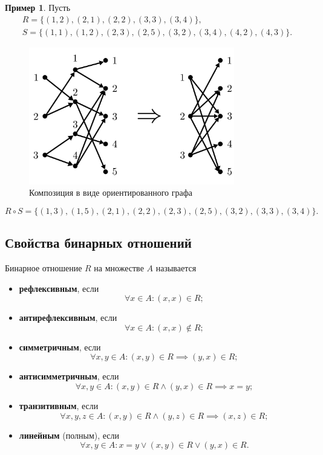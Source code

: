 \documentclass[a5paper, 11pt]{extarticle}
\theoremstyle{definition}
\newtheorem*{example*}{Пример}
\theoremstyle{definition}
\theoremstyle{definition}
\numberwithin{figure}{section}
\numberwithin{table}{section}
\begin{document}
\begin{example*}
    Пусть
    \begin{gather*}
        R = \{(1, 2), (2, 1), (2, 2), (3, 3), (3, 4)\}, \\
        S = \{(1, 1), (1, 2), (2, 3), (2, 5), (3, 2), (3, 4), (4, 2), (4, 3)\}.
    \end{gather*}

    \begin{figure}[H]
        \centering
        \includegraphics[width=0.8\textwidth]{images/composition-graph.png}
        \caption{Композиция в виде ориентированного графа}
    \end{figure}

    \[
        R \circ S = \{(1, 3), (1, 5), (2, 1), (2, 2), (2, 3), (2, 5), (3, 2), (3, 3), (3, 4)\}.
    \]
\end{example*}

\subsection{Свойства бинарных отношений}

Бинарное отношение \(R\) на множестве \(A\) называется
\begin{itemize}
    \item \textbf{рефлексивным}, если
          \[
              \forall x \in A : (x, x) \in R;
          \]
    \item \textbf{антирефлексивным}, если
          \[
              \forall x \in A : (x, x) \notin R;
          \]
    \item \textbf{симметричным}, если
          \[
              \forall x, y \in A : (x, y) \in R \implies (y, x) \in R ;
          \]
    \item \textbf{антисимметричным}, если
          \[
              \forall x, y \in A : (x, y) \in R \land (y, x) \in R \implies x = y;
          \]
    \item \textbf{транзитивным}, если
          \[
              \forall x, y, z \in A : (x, y) \in R \land (y, z) \in R \implies (x, z) \in R;
          \]
    \item \textbf{линейным} (полным), если
          \[
              \forall x, y \in A : x = y \lor (x, y) \in R \lor (y, x) \in R.
          \]
\end{itemize}
\end{document}
